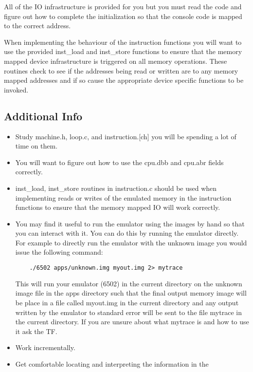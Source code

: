 \documentclass[11pt]{article}
\begin{document}
{All of the IO infrastructure is provided for you but you must read the
code and figure out how to complete the initialization so that the
console code is mapped to the correct address. 

When implementing the behaviour of the instruction functions you will
want to use the provided inst\_load and inst\_store functions to ensure
that the memory mapped device infrastructure is triggered on all
memory operations.  These routines check to see if the addresses being
read or written are to any memory mapped addresses and if so cause
the appropriate device specific functions to be invoked.

\subsection{Additional Info}
\begin{itemize}
\item Study machine.h, loop.c, and instruction.[ch] you will be
  spending a lot of time on them.
\item You will want to figure out how to use the cpu.dbb and cpu.abr fields correctly.
\item inst\_load, inst\_store routines in instruction.c should be used
  when implementing reads or writes of the emulated memory in the 
  instruction functions to ensure that the memory mapped IO will work
  correctly.  
\item You may find it useful to
  run the emulator using the images by hand so that you can interact
  with it. You can do this by running the emulator directly.  For
  example to directly run the emulator with the unknown image you
  would issue the following command:
  \begin{center}
   \begin{verbatim}
    ./6502 apps/unknown.img myout.img 2> mytrace
   \end{verbatim}
  \end{center}
  This will run your emulator (6502) in the current directory on the
  unknown image file in the apps directory such that the final output
  memory image will be place in a file called myout.img in the current
  directory and any output written by the emulator to standard
  error will be sent to the file mytrace in the current
  directory.  If you are unsure about what mytrace is and how to use
  it ask the TF.
\item Work incrementally. 
\item Get comfortable locating and interpreting the information in the

\end{itemize}}
\end{document}
